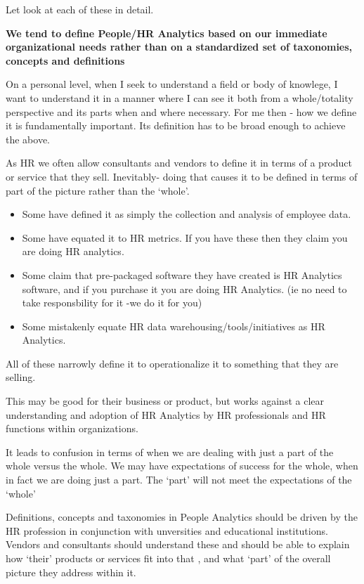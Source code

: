 \documentclass[12pt,letterpaper]{article}
\begin{document}
Let look at each of these in detail.

\textbf{We tend to define People/HR Analytics based on our immediate
organizational needs rather than on a standardized set of taxonomies,
concepts and definitions}

On a personal level, when I seek to understand a field or body of
knowlege, I want to understand it in a manner where I can see it both
from a whole/totality perspective and its parts when and where
necessary. For me then - how we define it is fundamentally important.
Its definition has to be broad enough to achieve the above.

As HR we often allow consultants and vendors to define it in terms of a
product or service that they sell. Inevitably- doing that causes it to
be defined in terms of part of the picture rather than the `whole'.

\begin{itemize}
\item
  Some have defined it as simply the collection and analysis of employee
  data.
\item
  Some have equated it to HR metrics. If you have these then they claim
  you are doing HR analytics.
\item
  Some claim that pre-packaged software they have created is HR
  Analytics software, and if you purchase it you are doing HR Analytics.
  (ie no need to take responsbility for it -we do it for you)
\item
  Some mistakenly equate HR data warehousing/tools/initiatives as HR
  Analytics.
\end{itemize}

All of these narrowly define it to operationalize it to something that
they are selling.

This may be good for their business or product, but works against a
clear understanding and adoption of HR Analytics by HR professionals and
HR functions within organizations.

It leads to confusion in terms of when we are dealing with just a part
of the whole versus the whole. We may have expectations of success for
the whole, when in fact we are doing just a part. The `part' will not
meet the expectations of the `whole'

Definitions, concepts and taxonomies in People Analytics should be
driven by the HR profession in conjunction with unversities and
educational institutions. Vendors and consultants should understand
these and should be able to explain how `their' products or services fit
into that , and what `part' of the overall picture they address within
it.
\end{document}
